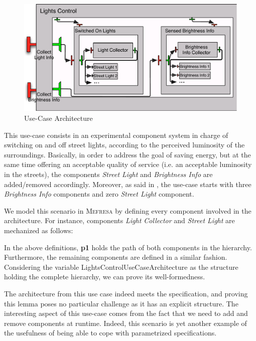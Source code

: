 	\begin{figure}[h!]
		\centering
   		\includegraphics[scale=0.5]{figures/chapter4/usecasearch.pdf} 
   		\caption{Use-Case Architecture}
   		\label{fig:auto}
		\end{figure}

\noindent This use-case consists in an experimental \textsf{component} system 
  in charge of switching on and off street lights, according to the perceived 
  luminosity of the surroundings. Basically, in order to address the goal of
  saving energy, but at the same time offering an acceptable quality of service
  (i.e. an acceptable luminosity in the streets), the \textsf{component}s \textit{Street Light}
  and \textit{Brightness Info} are added/removed accordingly. Moreover, as
 said in \cite{BHN:ICAS09}, the use-case starts with three \textit{Brightness Info}
 \textsf{component}s and zero \textit{Street Light} \textsf{component}. 
  
 We model this scenario in \textsc{Mefresa} by defining every
 \textsf{component} involved in the architecture. For instance, \textsf{component}s
 \textit{Light Collector} and \textit{Street Light} are mechanized as follows:
  
	
  
  
  \noindent In the above definitions, \textbf{p1} holds the path of 
  both \textsf{component}s in the hierarchy.
  Furthermore, the remaining \textsf{component}s are defined in a similar 
  fashion.  Considering the
  variable \textsf{LightsControlUseCaseArchitecture} as the
  structure holding the complete hierarchy, we can prove its
  well-formedness.
  
	  
  
	\noindent The architecture from this use case indeed meets
	the specification, and proving this lemma poses no particular challenge
	as it has an explicit structure. The interesting aspect of this use-case
	comes from the fact that we need to add and remove \textsf{component}s at runtime.
	Indeed, this scenario is yet another example of the usefulness of being able to
    cope with parametrized specifications.     
    
